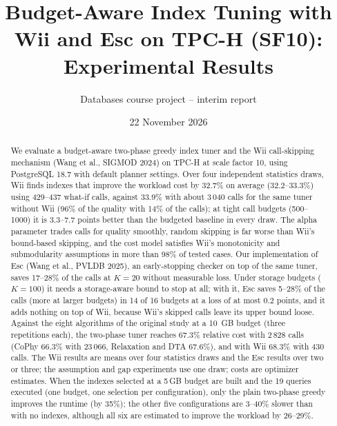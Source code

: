 \documentclass[11pt,a4paper]{article}
\title{Budget-Aware Index Tuning with Wii and Esc on TPC-H (SF10):\\ Experimental Results}
\author{Databases course project -- interim report}
\date{22 November 2026}
\begin{document}
\maketitle

\begin{abstract}
We evaluate a budget-aware two-phase greedy index tuner and the Wii call-skipping mechanism (Wang et al., SIGMOD 2024) on TPC-H at scale factor 10, using PostgreSQL 18.7 with default planner settings. Over four independent statistics draws, Wii finds indexes that improve the workload cost by 32.7\% on average (32.2--33.3\%) using 429--437 what-if calls, against 33.9\% with about 3\,040 calls for the same tuner without Wii (96\% of the quality with 14\% of the calls); at tight call budgets (500--1000) it is 3.3--7.7 points better than the budgeted baseline in every draw. The alpha parameter trades calls for quality smoothly, random skipping is far worse than Wii's bound-based skipping, and the cost model satisfies Wii's monotonicity and submodularity assumptions in more than 98\% of tested cases. Our implementation of Esc (Wang et al., PVLDB 2025), an early-stopping checker on top of the same tuner, saves 17--28\% of the calls at $K=20$ without measurable loss. Under storage budgets ($K=100$) it needs a storage-aware bound to stop at all; with it, Esc saves 5--28\% of the calls (more at larger budgets) in 14 of 16 budgets at a loss of at most 0.2 points, and it adds nothing on top of Wii, because Wii's skipped calls leave its upper bound loose. Against the eight algorithms of the original study at a 10~GB budget (three repetitions each), the two-phase tuner reaches 67.3\% relative cost with 2\,828 calls (CoPhy 66.3\% with 23\,066, Relaxation and DTA 67.6\%), and with Wii 68.3\% with 430 calls. The Wii results are means over four statistics draws and the Esc results over two or three; the assumption and gap experiments use one draw; costs are optimizer estimates. When the indexes selected at a 5\,GB budget are built and the 19 queries executed (one budget, one selection per configuration), only the plain two-phase greedy improves the runtime (by 35\%); the other five configurations are 3--40\% slower than with no indexes, although all six are estimated to improve the workload by 26--29\%.
\end{abstract}
\end{document}
